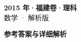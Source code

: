 \documentclass[zihao=-4, a4paper]{ctexart}
\begin{document}
\begin{center}
  {\Large\bfseries 2015 年·福建卷·理科}\\[4pt]
  {\large 数学 · 解析版}
\end{center}
\medskip
{}

\clearpage
{}
\begin{center}{\Large\bfseries 参考答案与详细解析}\end{center}
\medskip

\end{document}
